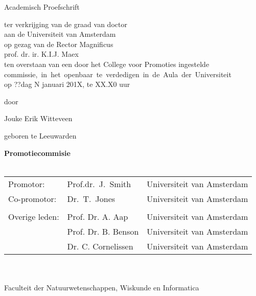 {%
\clearpage
\par\vskip 2cm
\begin{center}
\printtitle
\par\vspace {6cm}
{\large \sc Academisch Proefschrift}
\par\vspace {1cm}
{\large ter verkrijging van de graad van doctor\\
aan de Universiteit van Amsterdam\\
op gezag van de Rector Magnificus\\
prof. dr. ir. K.I.J. Maex\\                                 %
ten overstaan van een door het College voor Promoties ingestelde\\
\mbox{commissie, in het openbaar te verdedigen in de Aula der Universiteit}\\     %
op ??dag N januari 201X, te XX.X0 uur \\ }        %
\par\vspace {1cm} {\large door}
\par \vspace {1cm}
{\Large Jouke Erik Witteveen} %
\par\vspace {1cm}
{\large geboren te Leeuwarden}
\end{center}

\clearpage
\noindent%
{\bf Promotiecommisie}\\
\\
\begin{tabular}[t]{@{}llr}
Promotor:      & Prof.dr.\ J.~Smith  & Universiteit van Amsterdam \\  %
Co-promotor:   & Dr.\ T.~Jones       & Universiteit van Amsterdam \\  %
\\
Overige leden: & Prof. Dr. A. Aap    & Universiteit van Amsterdam \\  %
               & Prof. Dr. B. Benson & Universiteit van Amsterdam \\  %
               & Dr. C. Cornelissen  & Universiteit van Amsterdam \\  %
\end{tabular}\\
\\
Faculteit der Natuurwetenschappen, Wiskunde en Informatica \\
\clearpage
} %

